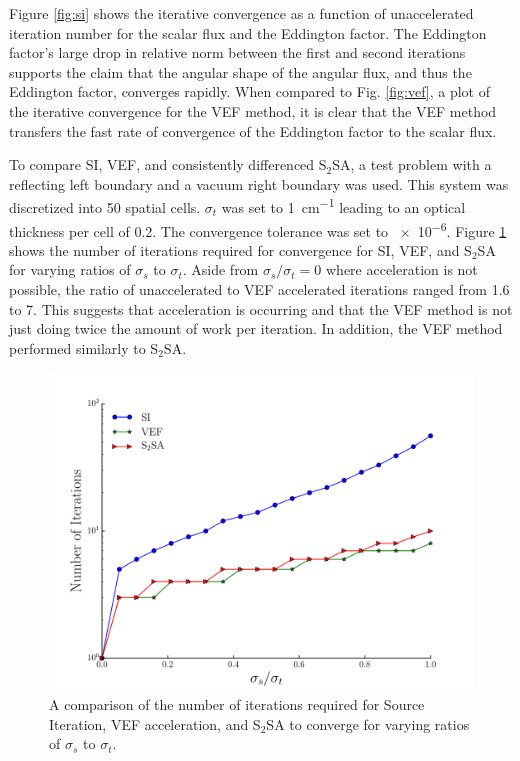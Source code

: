 Figure \ref{fig:si} shows the iterative convergence as a function of unaccelerated iteration number for the scalar flux and the Eddington factor. The Eddington factor's large drop in relative norm between the first and second iterations supports the claim that the angular shape of the angular flux, and thus the Eddington factor, converges rapidly. When compared to Fig. \ref{fig:vef}, a plot of the iterative convergence for the VEF method, it is clear that the VEF method transfers the fast rate of convergence of the Eddington factor to the scalar flux. 



To compare SI, VEF, and consistently differenced S$_2$SA, a test problem with a reflecting left boundary and a vacuum right boundary was used. This system was discretized into 50 spatial cells. $\sigma_t$ was set to \SI{1}{cm^{-1}} leading to an optical thickness per cell of 0.2. The convergence tolerance was set to \num{e-6}. Figure \ref{fig:si_vef_s2sa} shows the number of iterations required for convergence for SI, VEF, and S$_2$SA for varying ratios of $\sigma_s$ to $\sigma_t$. Aside from $\sigma_s/\sigma_t = 0$ where acceleration is not possible, the ratio of unaccelerated to VEF accelerated iterations ranged from 1.6 to 7. This suggests that acceleration is occurring and that the VEF method is not just doing twice the amount of work per iteration. In addition, the VEF method performed similarly to S$_2$SA. 

	\begin{figure}
		\centering
		\includegraphics[width=.75\textwidth]{figs/si_vef_s2sa.pdf} 
		\caption{A comparison of the number of iterations required for Source Iteration, VEF acceleration, and S$_2$SA to converge for varying ratios of $\sigma_s$ to $\sigma_t$. } 
		\label{fig:si_vef_s2sa}
	\end{figure}

